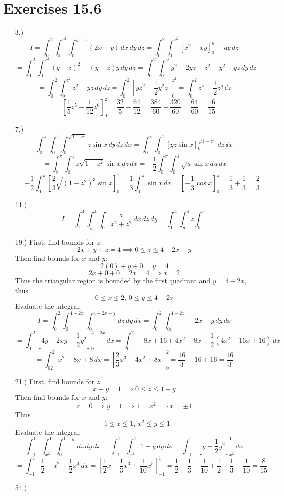 \documentclass[12pt]{article}
\newcommand{\bracks}[1]{\left[#1\right]}
\begin{document}
\pagestyle{fancy}
\fancyhead{}

\normalsize
\section*{Exercises 15.6}
\begin{itemize}
    \item [3.)] \[I=\int^2_0\int^{z^2}_0\int^{y-z}_0(2x-y)\,dx\,dy\,dz=\int^2_0\int^{z^2}_0\bracks{x^2-xy}^{y-z}_0\,dy\,dz\]
    \[=\int^2_0\int^{z^2}_0(y-z)^2-(y-z)y\,dy\,dz=\int^2_0\int^{z^2}_0y^2-2yz+z^2-y^2+yz\,dy\,dz\]
    \[=\int^2_0\int^{z^2}_0z^2-yz\,dy\,dz=\int^2_0\bracks{yz^2-\frac{1}{2}y^2z}^{z^2}_0=\int^2_0z^4-\frac{1}{2}z^5\,dz\]
    \[=\bracks{\frac{1}{5}z^5-\frac{1}{12}z^6}^2_0=\frac{32}{5}-\frac{64}{12}=\frac{384}{60}-\frac{320}{60}=\frac{64}{60}=\frac{16}{15}\]

    \item [7.)] \[\int^\pi_0\int^1_0\int^{\sqrt{1-z^2}}_0z\sin x\,dy\,dz\,dx=\int^\pi_0\int^1_0\bracks{yz\sin x}^{\sqrt{1-z^2}}_0\,dz\,dx\]
    \[=\int^\pi_0\int^1_0z\sqrt{1-z^2}\sin x\,dz\,dx=-\frac{1}{2}\int^\pi_0\int^1_0\sqrt u\sin x\,du\,dx\]
    \[=-\frac{1}{2}\int^\pi_0\bracks{\frac{2}{3}\sqrt{(1-z^2)^3}\sin x}^1_0=\frac{1}{3}\int^\pi_0\sin x\,dx=\bracks{-\frac{1}{3}\cos x}^\pi_0=\frac{1}{3}+\frac{1}{3}=\frac{2}{3}\]

    \item [11.)] \[I=\int^4_1\int^4_y\int^z_0\frac{z}{x^2+z^2}\,dx\,dz\,dy=\int^4_1\int^4_yz\int^z_0\frac{}{}\]

    \item [19.)] First, find bounds for $z$:
    \[2x+y+z=4\implies0\leq z\leq 4-2x-y\]
    Then find bounds for $x$ and $y$:
    \[2(0)+y+0=y=4\]
    \[2x+0+0=2x=4\implies x=2\]
    Thus the triangular region is bounded by the first quadrant and $y=4-2x$, thus
    \[0\leq x\leq2,\,0\leq y\leq4-2x\]
    Evaluate the integral:
    \[I=\int^2_0\int^{4-2x}_0\int^{4-2x-y}_0\,dz\,dy\,dx=\int^2_0\int^{4-2x}_04-2x-y\,dy\,dx\]
    \[=\int^2_0\bracks{4y-2xy-\frac{1}{2}y^2}^{4-2x}_0\,dx=\int^2_0-8x+16+4x^2-8x-\frac{1}{2}(4x^2-16x+16)\,dx\]
    \[=\int^2_02x^2-8x+8\,dx=\bracks{\frac{2}{3}x^3-4x^2+8x}^2_0=\frac{16}{3}-16+16=\frac{16}{3}\]

    \item [21.)] First, find bounds for $z$:
    \[x+y=1\implies0\leq z\leq1-y\]
    Then find bounds for $x$ and $y$:
    \[z=0\implies y=1\implies 1=x^2\implies x=\pm1\]
    Thus
    \[-1\leq x\leq1,\,x^2\leq y\leq1\]
    Evaluate the integral:
    \[\int^1_{-1}\int^1_{x^2}\int^{1-y}_0\,dz\,dy\,dx=\int^1_{-1}\int^1_{x^2}1-y\,dy\,dx=\int^1_{-1}\bracks{y-\frac{1}{2}y^2}^1_{x^2}\,dx\]
    \[=\int^1_{-1}\frac{1}{2}-x^2+\frac{1}{2}x^4\,dx=\bracks{\frac{1}{2}x-\frac{1}{3}x^3+\frac{1}{10}x^5}^1_{-1}=\frac{1}{2}-\frac{1}{3}+\frac{1}{10}+\frac{1}{2}-\frac{1}{3}+\frac{1}{10}=\frac{8}{15}\]

    \item [54.)]

\end{itemize}
\end{document}
